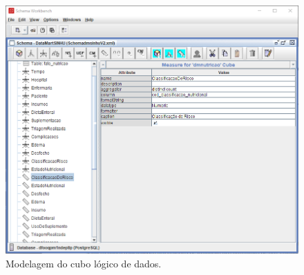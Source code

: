 \begin{figure}[htb]
	\caption{\label{fig_pentahoshemaworkbench}Modelagem do cubo lógico de dados.}
	\begin{center}
	    \includegraphics[scale=0.65]{Imagens/figura - schema workbench.png}
	\end{center}
\end{figure}

